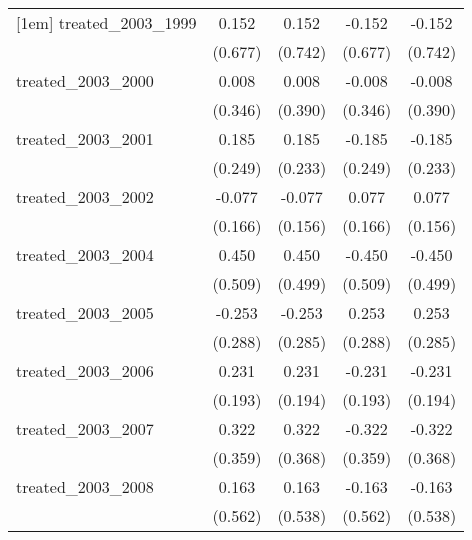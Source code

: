 {\begin{tabular}{l*{4}{c}}
[1em]
treated\_2003\_1999&       0.152         &       0.152         &      -0.152         &      -0.152         \\
            &     (0.677)         &     (0.742)         &     (0.677)         &     (0.742)         \\
[1em]
treated\_2003\_2000&       0.008         &       0.008         &      -0.008         &      -0.008         \\
            &     (0.346)         &     (0.390)         &     (0.346)         &     (0.390)         \\
[1em]
treated\_2003\_2001&       0.185         &       0.185         &      -0.185         &      -0.185         \\
            &     (0.249)         &     (0.233)         &     (0.249)         &     (0.233)         \\
[1em]
treated\_2003\_2002&      -0.077         &      -0.077         &       0.077         &       0.077         \\
            &     (0.166)         &     (0.156)         &     (0.166)         &     (0.156)         \\
[1em]
treated\_2003\_2004&       0.450         &       0.450         &      -0.450         &      -0.450         \\
            &     (0.509)         &     (0.499)         &     (0.509)         &     (0.499)         \\
[1em]
treated\_2003\_2005&      -0.253         &      -0.253         &       0.253         &       0.253         \\
            &     (0.288)         &     (0.285)         &     (0.288)         &     (0.285)         \\
[1em]
treated\_2003\_2006&       0.231         &       0.231         &      -0.231         &      -0.231         \\
            &     (0.193)         &     (0.194)         &     (0.193)         &     (0.194)         \\
[1em]
treated\_2003\_2007&       0.322         &       0.322         &      -0.322         &      -0.322         \\
            &     (0.359)         &     (0.368)         &     (0.359)         &     (0.368)         \\
[1em]
treated\_2003\_2008&       0.163         &       0.163         &      -0.163         &      -0.163         \\
            &     (0.562)         &     (0.538)         &     (0.562)         &     (0.538)         \\

\end{tabular}}
